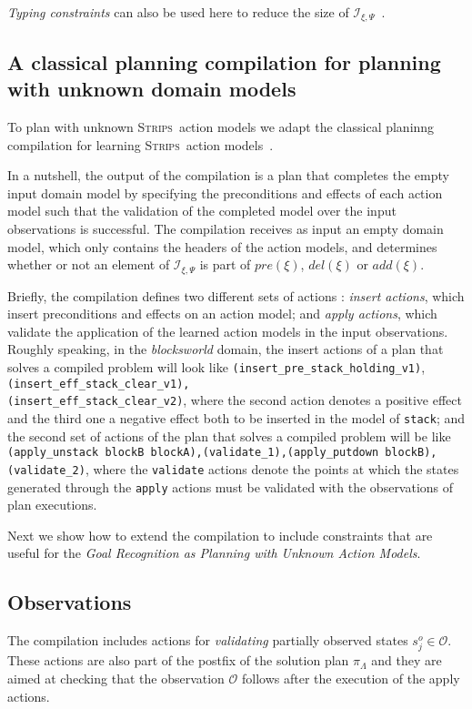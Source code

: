 \documentclass[letterpaper]{article} %
\newcommand{\strips}{\textsc{Strips}}     %
\begin{document}
{\em Typing constraints} can also be used here to reduce the size of ${\mathcal I}_{\xi,\Psi}$~\cite{mcdermott1998pddl}. 


\subsection{A classical planning compilation for planning with unknown domain models}
To plan with unknown \strips\ action models we adapt the classical planinng compilation for learning \strips\ action models~\cite{aineto2018learning}.

In a nutshell, the output of the compilation is a plan that completes the empty input domain model by specifying the preconditions and effects of each action model such that the validation of the completed model over the input observations is successful. The compilation receives as input an empty domain model, which only contains the headers of the action models, and determines whether or not an element of ${\mathcal I}_{\xi,\Psi}$ is part of $pre(\xi)$, $del(\xi)$ or $add(\xi)$.

Briefly, the compilation defines two different sets of actions : \emph{insert actions}, which insert preconditions and effects on an action model; and \emph{apply actions}, which validate the application of the learned action models in the input observations. Roughly speaking, in the \emph{blocksworld} domain, the insert actions of a plan that solves a compiled problem will look like {\tt{\footnotesize(insert\_pre\_stack\_holding\_v1)}},\\
{\tt{\footnotesize(insert\_eff\_stack\_clear\_v1),\\
(insert\_eff\_stack\_clear\_v2)}}, where the second action denotes a positive effect and the third one a negative effect both to be inserted in the model of {\tt{\small stack}}; and the second set of actions of the plan that solves a compiled problem will be like {\tt{\small (apply\_unstack blockB blockA),(validate\_1),(apply\_putdown blockB),(validate\_2)}}, where the {\tt {\small validate}} actions denote the points at which the states generated through the {\tt {\small apply}} actions must be validated with the observations of plan executions.



Next we show how to extend the compilation to include constraints that  are useful for the {\em Goal Recognition as Planning with Unknown Action Models}.

\subsection{Observations}
The compilation includes actions for {\em validating} partially observed states $s_j^o\in\mathcal{O}$. These actions are also part of the postfix of the solution plan $\pi_\Lambda$ and they are aimed at checking that the observation $\mathcal{O}$ follows after the execution of the apply actions.
\end{document}

